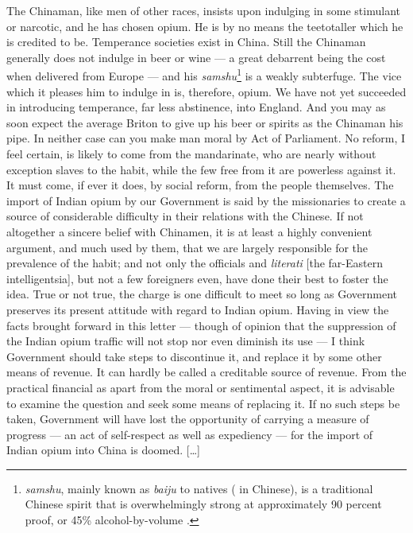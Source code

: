 \begin{fancyquote}
        [\ldots] The Chinaman, like men of other races, insists upon indulging
        in some stimulant or narcotic, and he has chosen opium. He is by no
        means the teetotaller which he is credited to be. Temperance societies
        exist in China. Still the Chinaman generally does not indulge in beer or
        wine --- a great debarrent being the cost when delivered from Europe ---
        and his \textit{samshu}\footnote{\textit{samshu}, mainly known as
        \textit{baiju} to natives ( in Chinese), is a traditional
        Chinese spirit that is overwhelmingly strong at approximately 90 percent
        proof, or 45\% alcohol-by-volume \autocite{Antkiewicz:1993}.} is a
        weakly subterfuge. The vice which it pleases him to indulge in is,
        therefore, opium. We have not yet succeeded in introducing temperance,
        far less abstinence, into England.  And you may as soon expect the
        average Briton to give up his beer or spirits as the Chinaman his pipe.
        In neither case can you make man moral by Act of Parliament. No reform,
        I feel certain, is likely to come from the mandarinate, who are nearly
        without exception slaves to the habit, while the few free from it are
        powerless against it. It must come, if ever it does, by social reform,
        from the people themselves. The import of Indian opium by our Government
        is said by the missionaries to create a source of considerable
        difficulty in their relations with the Chinese.  If not altogether a
        sincere belief with Chinamen, it is at least a highly convenient
        argument, and much used by them, that we are largely responsible for the
        prevalence of the habit; and not only the officials and
        \textit{literati} [the far-Eastern intelligentsia], but not a few
        foreigners even, have done their best to foster the idea. True or not
        true, the charge is one difficult to meet so long as Government
        preserves its present attitude with regard to Indian opium. Having in
        view the facts brought forward in this letter --- though of opinion that
        the suppression of the Indian opium traffic will not stop nor even
        diminish its use --- I think Government should take steps to discontinue
        it, and replace it by some other means of revenue. It can hardly be
        called a creditable source of revenue. From the practical financial as
        apart from the moral or sentimental aspect, it is advisable to examine
        the question and seek some means of replacing it. If no such steps be
        taken, Government will have lost the opportunity of carrying a measure
        of progress --- an act of self-respect as well as expediency --- for the
        import of Indian opium into China is doomed. [\ldots]
	\begin{flushright}
		\autocite{SpecialCorrespondent:1884}
	\end{flushright}
\end{fancyquote}

